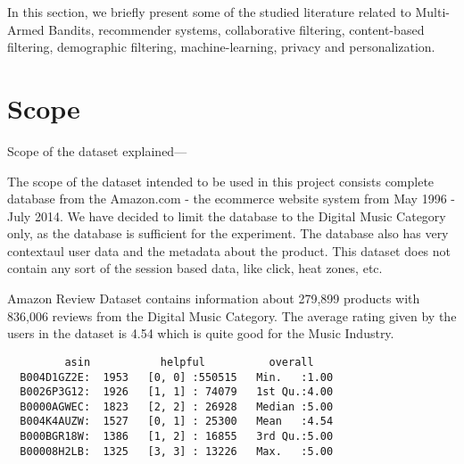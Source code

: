 In this section, we briefly present some of the studied literature related to Multi-Armed Bandits, recommender systems, collaborative filtering, content-based filtering, demographic filtering, machine-learning, privacy and personalization.

\section{Scope}

Scope of the dataset explained---

The scope of the dataset intended to be used in this project consists complete database from the Amazon.com - the ecommerce website system from May 1996 - July 2014. We have decided to limit the database to the Digital Music Category only, as the database is sufficient for the experiment. The database also has very contextaul user data and the metadata about the product. This dataset does not contain any sort of the session based data, like click, heat zones, etc.

Amazon Review Dataset contains information about 279,899 products with 836,006 reviews from the Digital Music Category.
The average rating given by the users in the dataset is 4.54 which is quite good for the Music Industry.

\begin{verbatim}
         asin           helpful          overall    
  B004D1GZ2E:  1953   [0, 0] :550515   Min.   :1.00  
  B0026P3G12:  1926   [1, 1] : 74079   1st Qu.:4.00  
  B0000AGWEC:  1823   [2, 2] : 26928   Median :5.00  
  B004K4AUZW:  1527   [0, 1] : 25300   Mean   :4.54  
  B000BGR18W:  1386   [1, 2] : 16855   3rd Qu.:5.00  
  B00008H2LB:  1325   [3, 3] : 13226   Max.   :5.00  
\end{verbatim}


